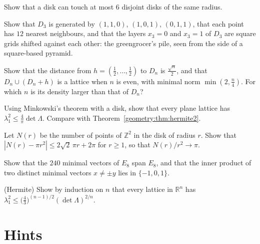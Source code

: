 \begin{exercise}[$\star$]\label{geometry:ex:kissing2}
Show that a disk can touch at most $6$ disjoint disks of the same radius.
\end{exercise}

\begin{exercise}[$\star\star$]\label{geometry:ex:fcc}
Show that $D_3$ is generated by $(1,1,0)$, $(1,0,1)$, $(0,1,1)$, that each point has $12$ nearest neighbours, and that the layers $x_3=0$ and $x_3=1$ of $D_3$
are square grids shifted against each other: the greengrocer's pile, seen from the side of a square-based pyramid.
\end{exercise}

\begin{exercise}[$\star\star$]\label{geometry:ex:deephole}
Show that the distance from $h=(\frac12,\dots,\frac12)$ to $D_n$ is $\frac{\sqrt n}2$, and that $D_n\cup(D_n+h)$ is a lattice when $n$ is even, with
minimal norm $\min(2,\frac n4)$. For which $n$ is its density larger than that of $D_n$?
\end{exercise}

\begin{exercise}[$\star\star$]\label{geometry:ex:minkowskibound}
Using Minkowski's theorem with a disk, show that every plane lattice has $\lambda_1^2\le\frac4\pi\det\Lambda$. Compare with Theorem~\ref{geometry:thm:hermite2}.
\end{exercise}

\begin{exercise}[$\star\star$]\label{geometry:ex:circlecount}
Let $N(r)$ be the number of points of $\mathbb Z^2$ in the disk of radius $r$. Show that $|N(r)-\pi r^2|\le 2\sqrt2\,\pi r+2\pi$ for $r\ge1$, so that $N(r)/r^2\to\pi$.
\end{exercise}

\begin{exercise}[$\star$]\label{geometry:ex:e8roots}
Show that the $240$ minimal vectors of $E_8$ span $E_8$, and that the inner product of two distinct minimal vectors $x\ne\pm y$ lies in $\{-1,0,1\}$.
\end{exercise}

\begin{exercise}[$\star\star\star$]\label{geometry:ex:hermite}
(Hermite) Show by induction on $n$ that every lattice in $\mathbb R^n$ has $\lambda_1^2\le\bigl(\frac43\bigr)^{(n-1)/2}(\det\Lambda)^{2/n}$.
\end{exercise}

\section{Hints}

